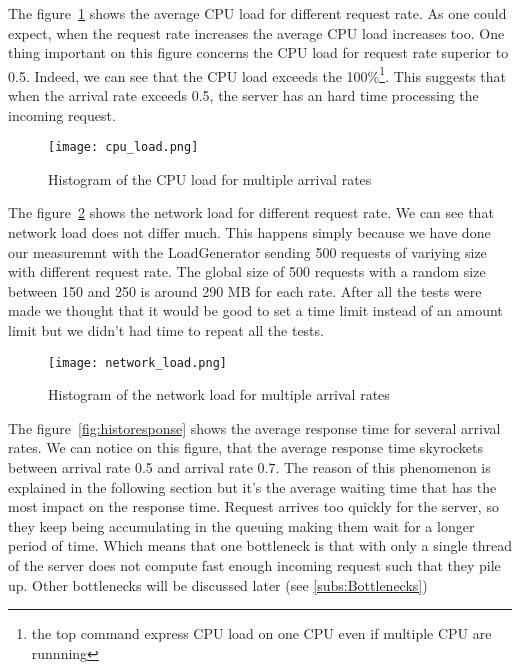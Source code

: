 The figure~\ref{fig:histocpu} shows the average CPU load for different request rate. As one could expect, when the request rate increases the average CPU load increases too. One thing important on this figure concerns the CPU load for request rate superior to 0.5. Indeed, we can see that the CPU load exceeds the 100\%\footnote{the top command express CPU load on one CPU even if multiple CPU are runnning}. This suggests that when the arrival rate exceeds 0.5, the server has an hard time processing the incoming request. \newline

\begin{figure}[!ht]
    \centering
    \texttt{[image: cpu\_load.png]}
    \caption{Histogram of the CPU load for multiple arrival rates}
    \label{fig:histocpu}
\end{figure}

The figure~\ref{fig:histonetwork} shows the network load for different request rate. We can see that network load does not differ much. This happens simply because we have done our measuremnt with the LoadGenerator sending 500 requests of variying size with different request rate. The global size of 500 requests with a random size between 150 and 250 is around 290 MB for each rate. After all the tests were made we thought that it would be good to set a time limit instead of an amount limit but we didn't had time to repeat all the tests. \newline

\begin{figure}[!ht]
    \centering
    \texttt{[image: network\_load.png]}
    \caption{Histogram of the network load for multiple arrival rates}
    \label{fig:histonetwork}
\end{figure}

The figure~\ref{fig:historesponse} shows the average response time for several arrival rates. We can notice on this figure, that the average response time skyrockets between arrival rate 0.5 and arrival rate $0.7$. The reason of this phenomenon is explained in the following section but it's the average waiting time that has the most impact on the response time. Request arrives too quickly
for the server, so they keep being accumulating in the queuing making them wait for a longer period of time. Which means that one bottleneck is that with only a single thread of the server does not compute fast enough incoming request such that they pile up. Other bottlenecks will be discussed later (see  \ref{subs:Bottlenecks})

